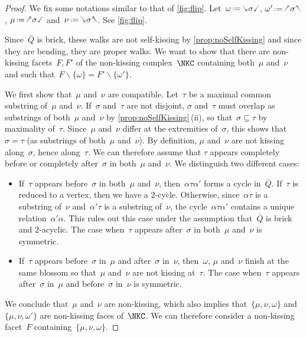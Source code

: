 \documentclass{amsart}
\theoremstyle{definition}
\newcommand{\ssm}{\smallsetminus} %
\newcommand{\eqdef}{\mbox{\,\raisebox{0.2ex}{\scriptsize\ensuremath{\mathrm:}}\ensuremath{=}\,}} %
\newcommand{\quiver}{\bar Q} %
\newcommand{\hL}{\text{\rotatebox[origin=c]{180}{\checked}}}
\newcommand{\hR}{\text{\rotatebox[origin=c]{180}{\reflectbox{\checked}}}}
\newcommand{\cL}{\text{\reflectbox{\checked}}}
\newcommand{\cR}{\text{\checked}}
\newcommand{\hh}[1]{\hL#1\hR} %
\newcommand{\cc}[1]{\cL#1\cR} %
\newcommand{\hc}[1]{\hL#1\cR} %
\newcommand{\ch}[1]{\cL#1\hR} %
\begin{document}
\begin{proof}
We fix some notations similar to that of \cref{fig:flip}.
Let~$\omega \eqdef \cc{\sigma}$, $\omega' \eqdef \hh{\sigma}$, $\mu \eqdef \hc{\sigma}$ and~$\nu \eqdef \ch{\sigma}$.
See \cref{fig:flip}.

Since~$\quiver$ is brick, these walks are not self-kissing by \cref{prop:noSelfKissing} and since they are bending, they are proper walks.
We want to show that there are non-kissing facets~$F, F'$ of the non-kissing complex~$\NKC$ containing both~$\mu$ and~$\nu$ and such that~$F \ssm \{\omega\} = F' \ssm \{\omega'\}$.

We first show that~$\mu$ and~$\nu$ are compatible.
Let~$\tau$ be a maximal common substring of~$\mu$ and~$\nu$.
If~$\sigma$ and~$\tau$ are not disjoint, $\sigma$ and~$\tau$ must overlap as substrings of both~$\mu$ and~$\nu$ by \cref{prop:noSelfKissing}\,(ii), so that~$\sigma \subseteq \tau$ by maximality of~$\tau$.
Since~$\mu$ and~$\nu$ differ at the extremities of~$\sigma$, this shows that~$\sigma = \tau$ (as substrings of both~$\mu$ and~$\nu$).
By definition, $\mu$ and~$\nu$ are not kissing along~$\sigma$, hence along~$\tau$.
We can therefore assume that $\tau$ appears completely before or completely after~$\sigma$ in both~$\mu$ and~$\nu$.
We distinguish two different cases:
\begin{itemize}
\item If~$\tau$ appears before~$\sigma$ in both~$\mu$ and~$\nu$, then~$\alpha \tau \alpha'$ forms a cycle in~$\quiver$. If~$\tau$ is reduced to a vertex, then we have a $2$-cycle. Otherwise, since~$\alpha\tau$ is a substring of~$\nu$ and~$\alpha'\tau$ is a substring of~$\nu$, the cycle~$\alpha \tau \alpha'$ contains a unique relation~$\alpha'\alpha$. This rules out this case under the assumption that~$\quiver$ is brick and $2$-acyclic. The case when~$\tau$ appears after~$\sigma$ in both~$\mu$ and~$\nu$ is symmetric.
\item If~$\tau$ appears before~$\sigma$ in~$\mu$ and after~$\sigma$ in~$\nu$, then~$\omega$, $\mu$ and~$\nu$ finish at the same blossom so that~$\mu$ and~$\nu$ are not kissing at~$\tau$. The case when~$\tau$ appears after~$\sigma$ in~$\mu$ and before~$\sigma$ in~$\nu$ is symmetric.
\end{itemize}
We conclude that~$\mu$ and~$\nu$ are non-kissing, which also implies that~$\{\mu, \nu, \omega\}$ and~$\{\mu, \nu, \omega'\}$ are non-kissing faces of~$\NKC$.
We can therefore consider a non-kissing facet~$F$ containing~$\{\mu, \nu, \omega\}$.


\end{proof}
\end{document}
